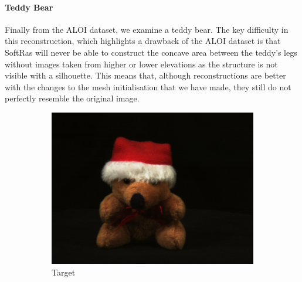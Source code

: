 \documentclass{article}
\begin{document}
\newpage
\paragraph{Teddy Bear}
Finally from the ALOI dataset, we examine a teddy bear. The key difficulty in this reconstruction, which highlights a drawback of the ALOI dataset is that SoftRas will never be able to construct the concave area between the teddy's legs without images taken from higher or lower elevations as the structure is not visible with a silhouette. This means that, although reconstructions are better with the changes to the mesh initialisation that we have made, they still do not perfectly resemble the original image.

\begin{figure}[h!]
  \centering
  \begin{subfigure}{.3\textwidth}
    \centering
    \includegraphics[width=\textwidth]{images/teddy.png}
    \caption{Target}
    \label{results-teddy-png}
  \end{subfigure}
  \hfill
  \begin{subfigure}{.3\textwidth}
    \centering

\end{subfigure}
\end{figure}
\end{document}
